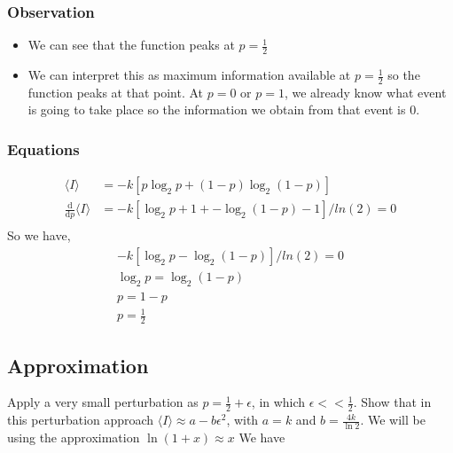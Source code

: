 \documentclass{article}
\begin{document}
\subsubsection{Observation}
\begin{itemize}
    \item We can see that the function peaks at $p = \frac{1}{2}$
    \item We can interpret this as maximum information available at $p = \frac{1}{2}$ so the function peaks at that point. At $p = 0$ or $p = 1$, we already know what event is going to take place so the information we obtain from that event is 0.
\end{itemize}

\subsubsection{Equations}
\begin{equation*}
  \begin{aligned}
    \langle I \rangle &= -k[p\log_2{p} + (1-p)\log_2{(1-p)}]\\
    \frac{\mathrm{d}}{\mathrm{d}p}\langle I \rangle &= -k[\log_2{p} + 1 + -\log_2{(1-p)} -1]/ln(2) = 0\\
  \end{aligned}
\end{equation*}
So we have,
\begin{equation*}
  \begin{aligned}
     -k[\log_2{p}  -\log_2{(1-p)} ]/ln(2) = 0\\
     \log_2{p} = \log_2{(1-p)}\\
     p = 1 - p\\
     p = \frac{1}{2}
  \end{aligned}
\end{equation*}

\subsection{Approximation}
Apply a very small perturbation as $p = \frac{1}{2} + \epsilon$, in which $\epsilon << \frac{1}{2}$. Show that in this perturbation
approach $\langle I \rangle \approx a - b\epsilon^2$, with $a = k$ and $b = \frac{4k}{\ln2}$.
\newline
We will be using the approximation $\ln{(1+x)} \approx x$
\newline
\newline
We have
\end{document}
